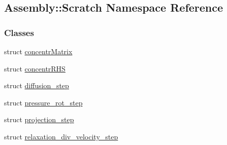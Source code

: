 \hypertarget{namespace_assembly_1_1_scratch}{}\subsection{Assembly\+:\+:Scratch Namespace Reference}
\label{namespace_assembly_1_1_scratch}
\subsubsection*{Classes}
\begin{DoxyCompactItemize}
\item 
struct \hyperlink{struct_assembly_1_1_scratch_1_1concentr_matrix}{concentr\+Matrix}
\item 
struct \hyperlink{struct_assembly_1_1_scratch_1_1concentr_r_h_s}{concentr\+R\+H\+S}
\item 
struct \hyperlink{struct_assembly_1_1_scratch_1_1diffusion__step}{diffusion\+\_\+step}
\item 
struct \hyperlink{struct_assembly_1_1_scratch_1_1pressure__rot__step}{pressure\+\_\+rot\+\_\+step}
\item 
struct \hyperlink{struct_assembly_1_1_scratch_1_1projection__step}{projection\+\_\+step}
\item 
struct \hyperlink{struct_assembly_1_1_scratch_1_1relaxation__div__velocity__step}{relaxation\+\_\+div\+\_\+velocity\+\_\+step}
\end{DoxyCompactItemize}
